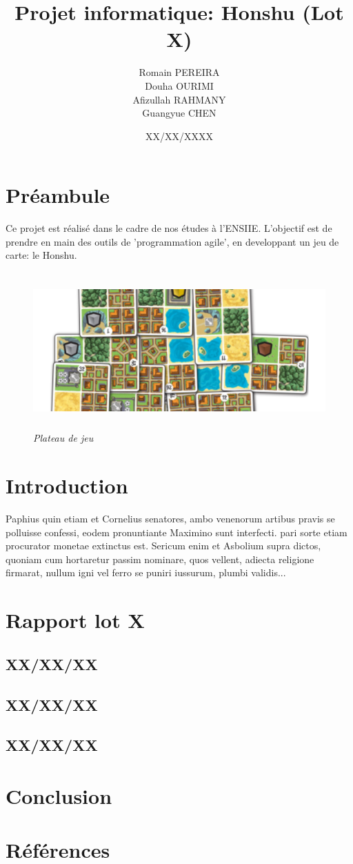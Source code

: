\documentclass[10pt]{article}
\title{Projet informatique: Honshu (Lot X)}
\author{
			Romain PEREIRA\\
			Douha OURIMI\\
			Afizullah RAHMANY\\
			Guangyue CHEN
}
\date{XX/XX/XXXX}
\begin{document}
	\maketitle
	\tableofcontents
	
	\newpage
	\section*{Préambule}
		Ce projet est réalisé dans le cadre de nos études à l'ENSIIE.
		L'objectif est de prendre en main des outils de 'programmation agile',
		en developpant un jeu de carte: le Honshu.
	\newline
	\begin{figure}[H]
		\begin{center}
			\includegraphics[height=6cm,keepaspectratio]{../images/honshu.png}
		\end{center}
		\caption{\textit{Plateau de jeu}}
		\label{honshu_introduction}
	\end{figure}

	\section{Introduction}
		Paphius quin etiam et Cornelius senatores, ambo venenorum artibus pravis se polluisse
		confessi, eodem pronuntiante Maximino sunt interfecti. pari sorte etiam procurator monetae
		extinctus est. Sericum enim et Asbolium supra dictos, quoniam cum hortaretur passim nominare,
		quos vellent, adiecta religione firmarat, nullum igni vel ferro se puniri iussurum, plumbi validis...
	\newpage
	\section{Rapport lot X}
		\subsection{XX/XX/XX}
		\subsection{XX/XX/XX}
		\subsection{XX/XX/XX}
		
	\section{Conclusion}

	\newpage
	\section{Références}
		\begin{thebibliography}{}
		\end{thebibliography}
\end{document}
